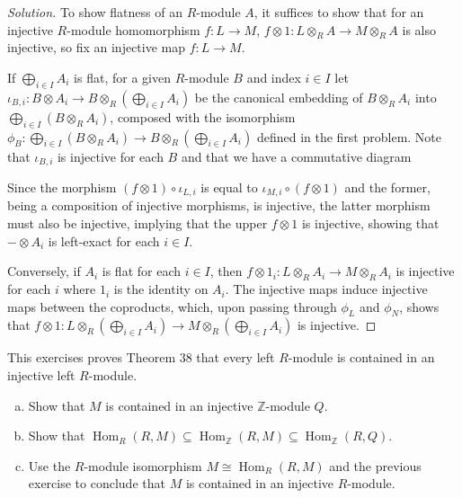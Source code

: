 \documentclass[10pt]{article}
\renewcommand{\hom}{\operatorname{Hom}}
\providecommand{\ZZ}{\mathbb Z}
\providecommand{\ii}{\item}
\newenvironment{soln}{\begin{proof}[Solution]}{\end{proof}}
\begin{document}
\begin{soln}
    To show flatness of an $R$-module $A$, it suffices to show that
    for an injective $R$-module homomorphism $f\colon L\to M$,
    $f\otimes 1\colon L\otimes_R A\to M\otimes_RA$ is also injective,
    so fix an injective map $f\colon L\to M$.

    If $\bigoplus_{i\in I}A_i$ is flat, for a given $R$-module $B$
    and index $i\in I$ let
    $\iota_{B,i}\colon B\otimes A_i\to B\otimes_R(\bigoplus_{i\in I}A_i)$
    be the canonical embedding of $B\otimes_R A_i$
    into $\bigoplus_{i\in I}(B\otimes_RA_i)$,
    composed with the isomorphism
    $\phi_B\colon \bigoplus_{i\in I}(B\otimes_RA_i)\to
    B\otimes_R(\bigoplus_{i\in I}A_i)$ defined in the first problem.
    Note that $\iota_{B,i}$ is injective for each $B$
    and that we have a commutative diagram
    \begin{center}
    \end{center}
    Since the morphism $(f\otimes 1)\circ\iota_{L,i}$
    is equal to $\iota_{M,i}\circ(f\otimes 1)$
    and the former, being a composition of injective morphisms,
    is injective, the latter morphism must also be injective,
    implying that the upper $f\otimes 1$ is injective,
    showing that $-\otimes A_i$ is left-exact for each $i\in I$.

    Conversely, if $A_i$ is flat for each $i\in I$,
    then $f\otimes 1_i\colon L\otimes_RA_i\to M\otimes_RA_i$
    is injective for each $i$ where $1_i$ is the identity on $A_i$.
    The injective maps induce injective maps between the coproducts,
    which, upon passing through $\phi_L$ and $\phi_N$,
    shows that $f\otimes 1\colon L\otimes_R(\bigoplus_{i\in I}A_i)\to
    M\otimes_R(\bigoplus_{i\in I}A_i)$ is injective.
\end{soln}

\begin{problem}
    This exercises proves Theorem 38 that
    every left $R$-module is contained in an injective left $R$-module.
    \begin{enumerate}[(a)]
        \ii Show that $M$ is contained in an injective $\ZZ$-module $Q$.
	\ii Show that
	$\hom_R(R,M)\subseteq\hom_\ZZ(R,M)\subseteq\hom_\ZZ(R,Q)$.
	\ii Use the $R$-module isomorphism $M\cong\hom_R(R,M)$
	and the previous exercise to conclude that
	$M$ is contained in an injective $R$-module.
    \end{enumerate}
\end{problem}
\end{document}
